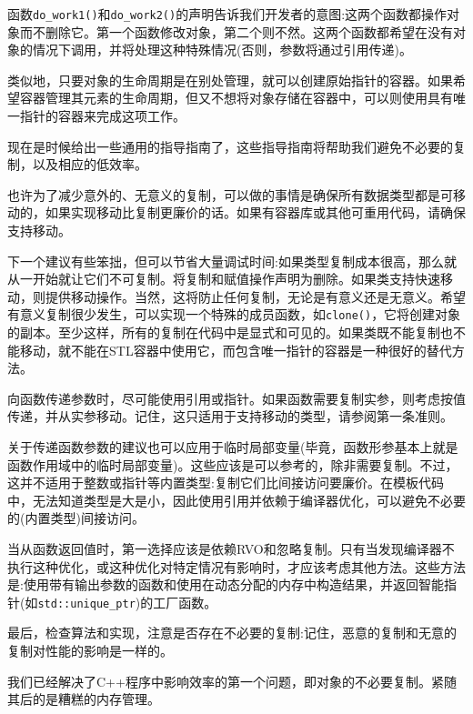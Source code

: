 函数\texttt{do\_work1()}和\texttt{do\_work2()}的声明告诉我们开发者的意图:这两个函数都操作对象而不删除它。第一个函数修改对象，第二个则不然。这两个函数都希望在没有对象的情况下调用，并将处理这种特殊情况(否则，参数将通过引用传递)。 

类似地，只要对象的生命周期是在别处管理，就可以创建原始指针的容器。如果希望容器管理其元素的生命周期，但又不想将对象存储在容器中，可以则使用具有唯一指针的容器来完成这项工作。 

现在是时候给出一些通用的指导指南了，这些指导指南将帮助我们避免不必要的复制，以及相应的低效率。


也许为了减少意外的、无意义的复制，可以做的事情是确保所有数据类型都是可移动的，如果实现移动比复制更廉价的话。如果有容器库或其他可重用代码，请确保支持移动。 

下一个建议有些笨拙，但可以节省大量调试时间:如果类型复制成本很高，那么就从一开始就让它们不可复制。将复制和赋值操作声明为删除。如果类支持快速移动，则提供移动操作。当然，这将防止任何复制，无论是有意义还是无意义。希望有意义复制很少发生，可以实现一个特殊的成员函数，如\texttt{clone()}，它将创建对象的副本。至少这样，所有的复制在代码中是显式和可见的。如果类既不能复制也不能移动，就不能在STL容器中使用它，而包含唯一指针的容器是一种很好的替代方法。 

向函数传递参数时，尽可能使用引用或指针。如果函数需要复制实参，则考虑按值传递，并从实参移动。记住，这只适用于支持移动的类型，请参阅第一条准则。

关于传递函数参数的建议也可以应用于临时局部变量(毕竟，函数形参基本上就是函数作用域中的临时局部变量)。这些应该是可以参考的，除非需要复制。不过，这并不适用于整数或指针等内置类型:复制它们比间接访问要廉价。在模板代码中，无法知道类型是大是小，因此使用引用并依赖于编译器优化，可以避免不必要的(内置类型)间接访问。

当从函数返回值时，第一选择应该是依赖RVO和忽略复制。只有当发现编译器不执行这种优化，或这种优化对特定情况有影响时，才应该考虑其他方法。这些方法是:使用带有输出参数的函数和使用在动态分配的内存中构造结果，并返回智能指针(如\texttt{std::unique\_ptr})的工厂函数。 

最后，检查算法和实现，注意是否存在不必要的复制:记住，恶意的复制和无意的复制对性能的影响是一样的。

我们已经解决了C++程序中影响效率的第一个问题，即对象的不必要复制。紧随其后的是糟糕的内存管理。














